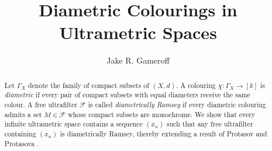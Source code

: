
\makeatletter
\def\@settitle{\begin{center}%
\baselineskip14\p@\relax
\normalfont\Large%
\@title
\end{center}%
}
\makeatother

\title{Diametric Colourings in Ultrametric Spaces}
\author{Jake R. Gameroff}

\begin{abstract}
Let \(\Gamma_X\) denote the family of compact subsets of $(X,d)$. A colouring \(\chi : \Gamma_X \to [k] \) is \emph{diametric} if every pair of compact subsets with equal diameters receive the same colour. A free ultrafilter \( \mathcal{F} \) is called \emph{diametrically Ramsey} if every diametric colouring admits a set $M \in \mathcal{F}$ whose compact subsets are monochrome. We show that every infinite ultrametric space contains a sequence $(x_n)$ such that any free ultrafilter containing $(x_n)$ is diametrically Ramsey, thereby extending a result of Protasov and Protasova \cite{protasov:2017}.
\end{abstract}
\maketitle









